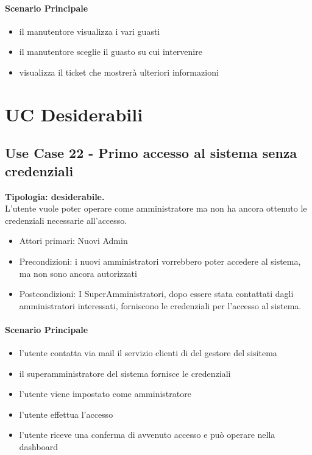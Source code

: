 \documentclass[12pt]{article}
\begin{document}
\paragraph{Scenario Principale}
\begin{itemize}
	\item il manutentore visualizza i vari guasti
	\item il manutentore sceglie il guasto su cui intervenire
	\item visualizza il ticket che mostrerà ulteriori informazioni
\end{itemize}


\section{UC Desiderabili}

\subsection{Use Case 22 - Primo accesso al sistema senza credenziali}
\textbf{Tipologia: desiderabile.} \\
L'utente vuole poter operare come amministratore ma non ha ancora ottenuto le credenziali necessarie all'accesso.
\begin{itemize}
	\item Attori primari: Nuovi Admin
	\item Precondizioni: i nuovi amministratori vorrebbero poter accedere al sistema, ma non sono ancora autorizzati
	\item Postcondizioni: I SuperAmministratori, dopo essere stata contattati dagli amministratori interessati, forniscono le credenziali per l'accesso al sistema.
\end{itemize}
\paragraph{Scenario Principale}
\begin{itemize}
	\item l'utente contatta via mail il servizio clienti di del gestore del sisitema
	\item il superamministratore del sistema fornisce le credenziali
	\item l'utente viene impostato come amministratore
	\item l'utente effettua l'accesso
	\item l'utente riceve una conferma di avvenuto accesso e può operare nella dashboard
\end{itemize}
\end{document}
